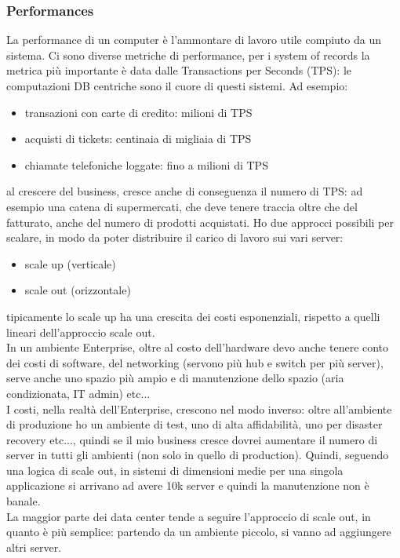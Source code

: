 \documentclass{article}
\begin{document}
\subsubsection{Performances}
La performance di un computer è l'ammontare di lavoro utile compiuto da un sistema. Ci sono diverse metriche di performance, per i system of records la metrica più importante è data dalle Transactions per Seconds (TPS): le computazioni DB centriche sono il cuore di questi sistemi. Ad esempio:
\begin{itemize}
\item transazioni con carte di credito: milioni di TPS
\item acquisti di tickets: centinaia di migliaia di TPS
\item chiamate telefoniche loggate: fino a milioni di TPS
\end{itemize}
al crescere del business, cresce anche di conseguenza il numero di TPS: ad esempio una catena di supermercati, che deve tenere traccia oltre che del fatturato, anche del numero di prodotti acquistati. Ho due approcci possibili per scalare, in modo da poter distribuire il carico di lavoro sui vari server:
\begin{itemize}
\item scale up (verticale)
\item scale out (orizzontale)
\end{itemize}
tipicamente lo scale up ha una crescita dei costi esponenziali, rispetto a quelli lineari dell'approccio scale out.\\ In un ambiente Enterprise, oltre al costo dell'hardware devo anche tenere conto dei costi di software, del networking (servono più hub e switch per più server), serve anche uno spazio più ampio e di manutenzione dello spazio (aria condizionata, IT admin) etc...\\ I costi, nella realtà dell'Enterprise, crescono nel modo inverso: oltre all'ambiente di produzione ho un ambiente di test, uno di alta affidabilità, uno per disaster recovery etc..., quindi se il mio business cresce dovrei aumentare il numero di server in tutti gli ambienti (non solo in quello di production). Quindi, seguendo una logica di scale out, in sistemi di dimensioni medie per una singola applicazione si arrivano ad avere 10k server e quindi la manutenzione non è banale.\\ La maggior parte dei data center tende a seguire l'approccio di scale out, in quanto è più semplice: partendo da un ambiente piccolo, si vanno ad aggiungere altri server.
\end{document}
